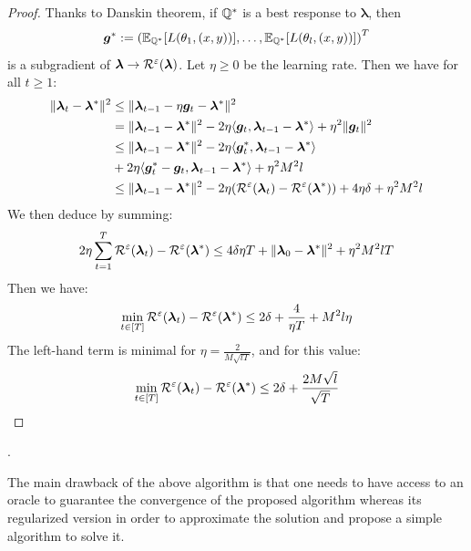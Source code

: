 \begin{proof}
Thanks to Danskin theorem, if $\mathbb{Q}^*$ is a best response to $\bm{\lambda}$, then $$\bm{g}^*:=\left(\mathbb{E}_{\QQ^*}\left[\loss(\theta_1,(x,y))\right],\dots,\mathbb{E}_{\QQ^*}\left[\loss(\theta_l,(x,y))\right]\right)^T$$ is a subgradient of $\bm{\lambda}\to \mathcal{R}^\varepsilon(\bm{\lambda})$. Let $\eta\geq 0$ be the learning rate. Then we have for all $t\geq 1$:
\begin{align*}
\lVert \bm{\lambda}_t-\bm{\lambda}^*\rVert^2&\leq \lVert \bm{\lambda}_{t-1}-\eta \bm{g}_t-\bm{\lambda}^*\rVert^2\\
&=\lVert \bm{\lambda}_{t-1}-\bm{\lambda}^*\rVert^2-2\eta \langle\bm{g}_t, \bm{\lambda}_{t-1}-\bm{\lambda}^*\rangle+ \eta^2\lVert \bm{g}_t\rVert^2\\
&\leq \lVert \bm{\lambda}_{t-1}-\bm{\lambda}^*\rVert^2-2\eta \langle\bm{g}^*_t, \bm{\lambda}_{t-1}-\bm{\lambda}^*\rangle\\
&+2\eta\langle\bm{g}^*_t-\bm{g}_t, \bm{\lambda}_{t-1}-\bm{\lambda}^*\rangle+\eta^2 M^2 l\\
&\leq \lVert \bm{\lambda}_{t-1}-\bm{\lambda}^*\rVert^2-2\eta\left(\risk^\varepsilon(\bm{\lambda}_t)-\risk^\varepsilon(\bm{\lambda}^*)\right) +4\eta\delta+\eta^2  M^2 l%
\end{align*}
We then deduce by summing:
\begin{align*}
   2\eta \sum_{t=1}^T \mathcal{R}^\varepsilon(\bm{\lambda}_t)-\mathcal{R}^\varepsilon(\bm{\lambda}^*) \leq 4\delta\eta T +\lVert \bm{\lambda}_{0}-\bm{\lambda}^*\rVert^2+\eta^2 M^2 lT
\end{align*}
Then we have:
\begin{align*}
    \min_{t\in[T]}\mathcal{R}^\varepsilon(\bm{\lambda}_t)-\mathcal{R}^\varepsilon(\bm{\lambda}^*)\leq 2\delta+\frac{4}{\eta T}+M^2l\eta
\end{align*}
The left-hand term is minimal for $\eta=\frac{2}{M\sqrt{lT}}$, and for this value:
\begin{align*}
    \min_{t\in[T]}\mathcal{R}^\varepsilon(\bm{\lambda}_t)-\mathcal{R}^\varepsilon(\bm{\lambda}^*)\leq 2\delta+\frac{2M\sqrt{l}}{\sqrt{T}}
\end{align*}
\end{proof}. 

The main drawback of the above algorithm is that one needs to have access to an oracle to guarantee the convergence of the proposed algorithm whereas its regularized version in order to approximate the solution and propose a simple algorithm to solve it.

